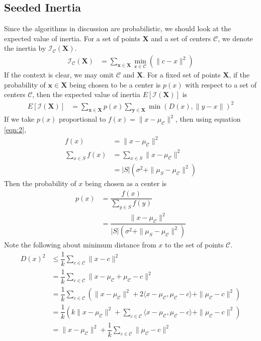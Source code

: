\documentclass[twoside, 11pt]{article}
\newcommand{\x}{\mathbf{x}}
\newcommand{\X}{\mathbf{X}}
\newcommand{\y}{\mathbf{y}}
\renewcommand{\c}{\mathbf{c}}
\newcommand{\C}{\mathcal{C}}
\newcommand{\I}{\mathcal{I}}
\begin{document}
	\subsection{Seeded Inertia}
	Since the algorithms in discussion are probabilistic, we should look at the expected value of inertia. For a set of points $\X$ and a set of centers $\C$, we denote the inertia by $\I_\C(\X)$. %
		\begin{align*}
			\I_\C(\X) & = \sum_{\x\in\X}\min_{\c\in\C}(\|c-x\|^2)
		\end{align*}
	If the context is clear, we may omit $\C$ and $\X$. For a fixed set of points $\X$, if the probability of $\x\in\X$ being chosen to be a center is $p(x)$ with respect to a set of centers $\C$, then the expected value of inertia $E[\I(\X)]$ is
		\begin{align*}
			E[\I(\X)] & = \sum_{\x\in\X}p(x)\sum_{\y\in\X}\min(D(x),\|y-x\|)^2
		\end{align*}
	If we take $p(x)$ proportional to $f(x)=\|x-\mu_{\C}\|^2$, then using equation \eqref{eqn:2},
		\begin{align*}
			f(x) & = \|x-\mu_{\C}\|^2\\
			\sum_{x\in S}f(x) 
				& = \sum_{x\in S}\|x-\mu_{\C}\|^2\\
				& = |S|(\sigma^2+\|\mu_S-\mu_{\C}\|^2)
		\end{align*}
	Then the probability of $x$ being chosen as a center is
		\begin{align*}
			p(x) & = \dfrac{f(x)}{\sum_{y\in S}f(y)}\\
				 & = \dfrac{\|x-\mu_{\C}\|^2}{|S|(\sigma^2+\|\mu_{S}-\mu_{\C}\|^2)}
		\end{align*}
	Note the following about minimum distance from $x$ to the set of points $\C$.
		\begin{align*}
			D(x)^2 & \leq \dfrac{1}{k}\sum_{c\in \C}\|x-c\|^2\\
					& = \dfrac{1}{k}\sum_{c\in \C}\|x-\mu_{\C}+\mu_{\C}-c\|^2\\
					& = \dfrac{1}{k}\sum_{c\in \C}\left(\|x-\mu_{\C}\|^2+2\langle x-\mu_{\C},\mu_{\C}-c\rangle+\|\mu_{\C}-c\|^2\right)\\
					& = \dfrac{1}{k}\left(k\|x-\mu_{\C}\|^2+\sum_{c\in \C}\langle x-\mu_{\C},\mu_{\C}-c\rangle+\|\mu_{\C}-c\|^2\right)\\
					& = \|x-\mu_{\C}\|^2+\dfrac{1}{k}\sum_{c\in\C}\|\mu_{\C}-c\|^2
		\end{align*}
\end{document}
